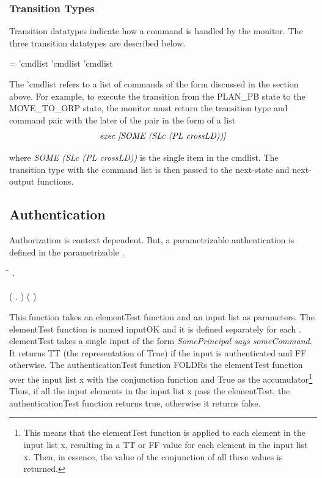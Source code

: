 \documentclass[../../main/main.tex]{subfiles}
\begin{document}
\subsubsection{Transition Types}
Transition datatypes indicate how a command is handled by the monitor.  The three transition datatypes are described below. 

 =  'cmdlist \HOLTokenBar{}  'cmdlist \HOLTokenBar{}  'cmdlist

The 'cmdlist refers to a list of commands of the form discussed in the section above.  For example, to execute the transition from the PLAN_PB state to the MOVE_TO_ORP state, the monitor must return the transition type and command pair with the later of the pair in the form of a list 
\[\text{\textit{exec [SOME (SLc (PL crossLD))]}} \]

where \textit{SOME (SLc (PL crossLD))} is the single item in the cmdlist.  The transition type with the command list is then passed to the next-state and next-output functions.

\subsection{Authentication}
Authorization is context dependent. But, a parametrizable authentication is defined in the parametrizable .

\begin{tabbing}
\parskip=8pt

\HOLTokenTurnstile{} \=\HOLSymConst{\HOLTokenForall{}} . \\
    \>     \HOLSymConst{\HOLTokenEquiv{}} \\
    \>  (\HOLTokenLambda{} .  \HOLSymConst{\HOLTokenConj{}} )  (  )
\parskip=18pt
\end{tabbing}

This function takes an elementTest function and an input list as parameters.  The elementTest function is named inputOK and it is defined separately for each .  elementTest takes a single input of the form \textit{SomePrincipal says someCommand}.  It returns TT (the  representation of True) if the input is authenticated and FF otherwise.  The authenticationTest function FOLDRs the elementTest function over the input list x with the conjunction function and True as the accumulator\footnote{This means that the elementTest function is applied to each element in the input list x, resulting in a TT or FF value for each element in the input list x.   Then, in essence, the value of the conjunction of all these values is returned.}  Thus, if all the input elements in the input list x pass the elementTest, the authenticationTest function returns true, otherwise it returns false.  
     
\end{document}
